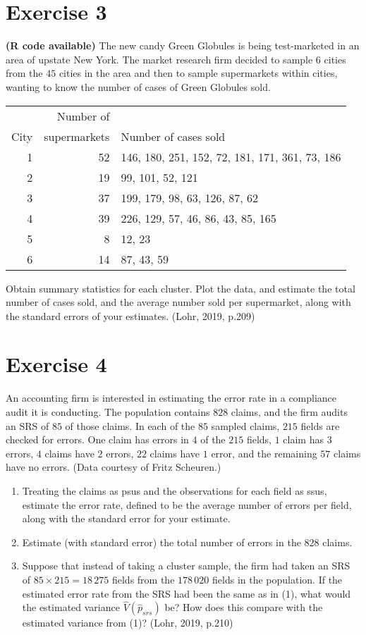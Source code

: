 \documentclass[12pt]{article}
\begin{document}
\section*{Exercise 3}
\textbf{\color{ForestGreen}(R code available)} The new candy Green Globules is being test-marketed in an area of upstate New York. The market research firm decided to sample $6$ cities from the $45$ cities in the area and  then to sample supermarkets within cities, wanting to know the number of cases of
Green Globules sold.
\begin{center}
\begin{tabular}{rrl}
 & Number of &  \\
City& supermarkets & Number of cases sold \\
\hline
1& 52& 146, 180, 251, 152, 72, 181, 171, 361, 73, 186 \\
2& 19& 99, 101, 52, 121\\
3 &37& 199, 179, 98, 63, 126, 87, 62\\
4 &39& 226, 129, 57, 46, 86, 43, 85, 165\\
5 &8 &12, 23\\
6 &14 &87, 43, 59\\
\end{tabular}
\end{center}
Obtain summary statistics for each cluster. Plot the data, and estimate the total number of cases sold, and the average number sold per supermarket, along with the standard errors of your estimates. \hfill (Lohr, 2019, p.209)

\section*{Exercise 4}
An accounting firm is interested in estimating the error rate in a compliance audit it is
conducting. The population contains $828$ claims, and the firm audits an SRS of $85$ of
those claims. In each of the $85$ sampled claims, $215$ fields are checked for errors. One
claim has errors in $4$ of the $215$ fields, $1$ claim has $3$ errors, $4$ claims have $2$ errors,
$22$ claims have $1$ error, and the remaining $57$ claims have no errors. (Data courtesy of
Fritz Scheuren.)
\begin{enumerate}
\item Treating the claims as psus and the observations for each field as ssus, estimate
the error rate, defined to be the average number of errors per field, along with the
standard error for your estimate.
\item Estimate (with standard error) the total number of errors in the $828$ claims.
\item Suppose that instead of taking a cluster sample, the firm had taken an SRS of $85\times 215=18\,275$ fields from the $178\,020$ fields in the population. If the estimated
error rate from the SRS had been the same as in (1), what would the estimated
variance $\hat{V}(\hat{p}_{srs})$ be? How does this compare with the estimated variance
from (1)? \hfill (Lohr, 2019, p.210)
\end{enumerate}
\end{document}
